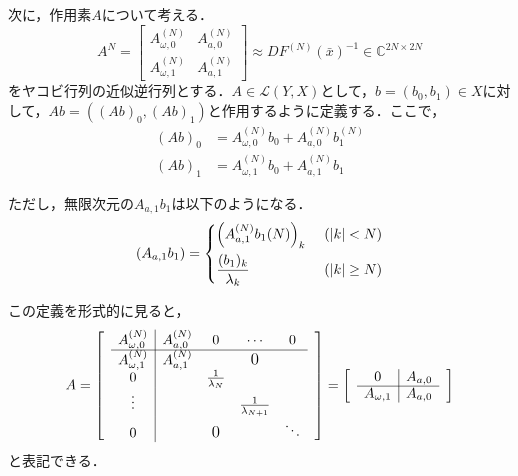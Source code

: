 \begin{dfn}
  次に，$作用素A$について考える．
  \begin{equation*}
    A^{N} = \begin{bmatrix}
      A_{\omega,0}^{(N)} & A_{a,0}^{(N)} \\
      A_{\omega,1}^{(N)} & A_{a,1}^{(N)}
    \end{bmatrix}
    \approx DF^{(N)} \left(\bar{x}\right)^{-1} \in \mathbb{C}^{2N\times 2N}
  \end{equation*}
  をヤコビ行列の近似逆行列とする．$A\in\mathcal{L}(Y,X)$として，$b=\left(b_0,b_1\right)\in X$に対して，$Ab=\left((Ab)_0,(Ab)_1\right)$と作用するように定義する．ここで，
  \begin{align*}
    (Ab)_0 & = A_{\omega,0}^{(N)}b_0 + A_{a,0}^{(N)} b_1^{(N)} \\
    (Ab)_1 & = A_{\omega,1}^{(N)}b_0 + A_{a,1}^{(N)} b_1
  \end{align*}

  ただし，無限次元の$A_{a,1}b_1$は以下のようになる．
  \begin{equation*}
    \left(A_{a,1}b_1\right)=\begin{dcases}
      \left(A_{a,1}^{(N)}b_1{(N)}\right)_k & \ (|k|<N)     \\
      \frac{(b_1)_k}{\lambda_k}            & \ (|k|\geq N)
    \end{dcases}
  \end{equation*}

  この定義を形式的に見ると，
  \begin{equation*}
    A =
    \begin{bmatrix}
       & \multicolumn{1}{c|}{A_{\omega,0}^{(N)}} & A_{a,0}^{(N)} & 0                   & \cdots                  & 0      & \\ \cline{2-6}
       & \multicolumn{1}{c|}{A_{\omega,1}^{(N)}} & A_{a,1}^{(N)} &                     & \text{\large{0}}        &        & \\
       & \multicolumn{1}{c|}{0}                  &               & \frac{1}{\lambda_N} &                         &        & \\
       & \multicolumn{1}{c|}{\vdots}             &               &                     & \frac{1}{\lambda_{N+1}} &        & \\
       & \multicolumn{1}{c|}{0}                  &               & \text{\large{0}}    &                         & \ddots & \\
    \end{bmatrix}
    =
    \begin{bmatrix}
       & \multicolumn{1}{c|}{0}            & A_{a,0} & \\ \cline{2-3}
       & \multicolumn{1}{c|}{A_{\omega,1}} & A_{a,0} &
    \end{bmatrix}
  \end{equation*}
  と表記できる．
\end{dfn}

